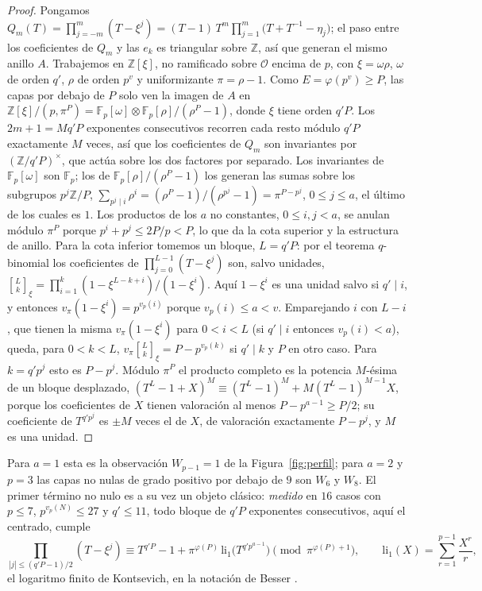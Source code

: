 \documentclass[11pt,a4paper]{article}
\theoremstyle{definition}
\newcommand{\ZZ}{\mathbb{Z}}
\newcommand{\FF}{\mathbb{F}}
\newcommand{\cO}{\mathcal{O}}
\begin{document}
\begin{proof}
Pongamos $Q_m(T)=\prod_{j=-m}^m(T-\xi^j)=(T-1)\,T^m\prod_{j=1}^m\bigl(T+T^{-1}-\eta_j\bigr)$; el paso entre los
coeficientes de $Q_m$ y las $e_k$ es triangular sobre $\ZZ$, así que generan el mismo anillo $A$. Trabajemos en
$\ZZ[\xi]$, no ramificado sobre $\cO$ encima de $p$, con $\xi=\omega\rho$, $\omega$ de orden $q'$, $\rho$ de orden $p^v$
y uniformizante $\pi=\rho-1$. Como $E=\varphi(p^v)\ge P$, las capas por debajo de $P$ solo ven la imagen de $A$ en
$\ZZ[\xi]/(p,\pi^P)=\FF_p[\omega]\otimes\FF_p[\rho]/(\rho^P-1)$, donde $\xi$ tiene orden $q'P$. Los $2m+1=Mq'P$
exponentes consecutivos recorren cada resto módulo $q'P$ exactamente $M$ veces, así que los coeficientes de $Q_m$ son
invariantes por $(\ZZ/q'P)^\times$, que actúa sobre los dos factores por separado. Los invariantes de $\FF_p[\omega]$
son $\FF_p$; los de $\FF_p[\rho]/(\rho^P-1)$ los generan las sumas sobre los subgrupos $p^j\ZZ/P$,
$\sum_{p^j\mid i}\rho^i=(\rho^P-1)/(\rho^{p^j}-1)=\pi^{P-p^j}$, $0\le j\le a$, el último de los cuales es $1$. Los
productos de los $a$ no constantes, $0\le i,j<a$, se anulan módulo $\pi^P$ porque $p^i+p^j\le2P/p<P$, lo que da la
cota superior y la estructura de anillo. Para la cota inferior tomemos un bloque,
$L=q'P$: por el teorema $q$-binomial los coeficientes de $\prod_{j=0}^{L-1}(T-\xi^j)$ son, salvo unidades,
$\genfrac{[}{]}{0pt}{}{L}{k}_\xi=\prod_{i=1}^k(1-\xi^{L-k+i})/(1-\xi^i)$. Aquí $1-\xi^i$ es una unidad salvo si $q'\mid i$,
y entonces $v_\pi(1-\xi^i)=p^{v_p(i)}$ porque $v_p(i)\le a<v$. Emparejando $i$ con $L-i$, que tienen la misma
$v_\pi(1-\xi^i)$ para $0<i<L$ (si $q'\mid i$ entonces $v_p(i)<a$), queda, para $0<k<L$,
$v_\pi\genfrac{[}{]}{0pt}{}{L}{k}_\xi=P-p^{v_p(k)}$ si $q'\mid k$ y $P$ en otro caso. Para $k=q'p^j$ esto es $P-p^j$.
Módulo $\pi^P$ el producto completo es la potencia $M$-ésima de un bloque desplazado, $(T^L-1+X)^M\equiv(T^L-1)^M+
M(T^L-1)^{M-1}X$, porque los coeficientes de $X$ tienen valoración al menos $P-p^{a-1}\ge P/2$; su coeficiente de
$T^{q'p^j}$ es $\pm M$ veces el de $X$, de valoración exactamente $P-p^j$, y $M$ es una unidad.
\end{proof}

\noindent Para $a=1$ esta es la observación $W_{p-1}=1$ de la Figura~\ref{fig:perfil}; para $a=2$ y $p=3$ las capas
no nulas de grado positivo por debajo de $9$ son $W_6$ y $W_8$. El primer término no nulo es a su vez un objeto
clásico: \emph{medido} en $16$ casos con $p\le7$, $p^{v_p(N)}\le27$ y $q'\le11$, todo bloque de $q'P$ exponentes consecutivos, aquí el centrado, cumple
\[
\prod_{|j|\le(q'P-1)/2}(T-\xi^j)\equiv T^{q'P}-1+\pi^{\varphi(P)}\,\mathrm{li}_1\bigl(T^{q'p^{a-1}}\bigr)
\pmod{\pi^{\varphi(P)+1}},\qquad \mathrm{li}_1(X)=\sum_{r=1}^{p-1}\frac{X^r}{r},
\]
el logaritmo finito de Kontsevich, en la notación de Besser \cite{Bes02}.
\end{document}
